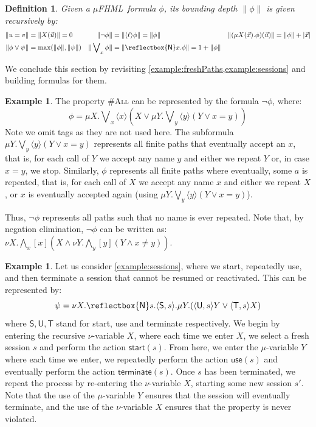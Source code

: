 \documentclass[10pt,a4paper]{article}
\newtheorem{definition}[theorem]{Definition}
\theoremstyle{definition}
\newtheorem{example}[theorem]{Example}
\theoremstyle{remark}
\newcommand\new[0]{\reflectbox{\ensuremath{\mathsf{N}}}}
\newcommand\fresh[1]{\new #1.}
\newcommand\fhml[0]{$\mu$FHML}
\newcommand\diam[1]{\langle#1\rangle}
\newcommand\sq[1]{[#1]}
\begin{document}
\begin{definition}
	Given a \fhml\ formula $\phi$, its bounding depth $\|\phi\|$ is given recursively by:	
	\begin{align*}
		\|u = v\| &= \|X(\vec u)\| = 0  &\|\lnot \phi\| &= \|\diam{\ell}\phi\| = \|\phi\| &\|(\mu X(\vec x).\phi)(\vec u)\| = \|\phi\| + |\vec x|\\
		\|\phi \lor \psi\| &= \max(\|\phi\|, \|\psi\|) & \|\bigvee\nolimits_x \phi\| &= \|\fresh{x} \phi\| = 1 + \|\phi\|   
	\end{align*}
\end{definition}


We conclude this section by revisiting \cref{example:freshPaths,example:sessions} and building formulas for them.

\begin{example} The property \textsc{\#All}
 can be represented by the formula $\lnot \phi$, where:
\[
	\phi = \mu X.\bigvee\nolimits_x\diam{x}(X\lor\mu Y.\bigvee\nolimits_y \diam{y}(Y\lor x=y))
\]
Note we omit tags as they are not used here.
The subformula $\mu Y.\bigvee\nolimits_y \diam{y}(Y\lor x=y)$ represents all finite paths that eventually accept an $x$, that is, for each call of $Y$ we accept any name $y$ and either  we repeat $Y$ or, in case $x = y$, we stop. 
Similarly, $\phi$ represents all finite paths where eventually, some $a$ is repeated, that is, for each call of $X$ we accept any name $x$ and either we 
repeat $X$, or $x$ is eventually accepted again (using $\mu Y.\bigvee\nolimits_y \diam{y}(Y\lor x=y)$).

Thus, $\lnot \phi$ represents all paths such that no name is ever repeated.
Note that, by negation elimination, $\lnot \phi$ can be written as:
$
\nu X.\bigwedge\nolimits_x\sq{x}( X\land \nu Y.\bigwedge\nolimits_y \sq{y}(Y\land x\neq y))
$.
\end{example}

\begin{example}
Let us consider \cref{example:sessions}, where we start, repeatedly use, and then terminate a session that cannot be resumed or reactivated. 
This can be represented by:
\[
	\psi = \nu X. \fresh{s}\diam{\mathsf{S}, s}.\mu Y.(\diam{\mathsf{U}, s}Y \lor \diam{\mathsf{T}, s}X)
\]
where $\mathsf{S,U,T}$ stand for start, use and terminate respectively.
We begin by entering the recursive $\nu$-variable $X$, where each time we enter $X$, we select a fresh session $s$ and perform the action $\mathsf{start}(s)$. 
From here, we enter the $\mu$-variable $Y$ where each time we enter, we repeatedly perform the action $\mathsf{use}(s)$ and eventually perform the action $\mathsf{terminate}(s)$. 
Once $s$ has been terminated, we repeat the process by re-entering the $\nu$-variable $X$, starting some new session $s'$. 
Note that the use of the $\mu$-variable $Y$ ensures that the session will eventually terminate, and the use of the $\nu$-variable $X$ ensures that the property is never violated.
\end{example}
\end{document}
